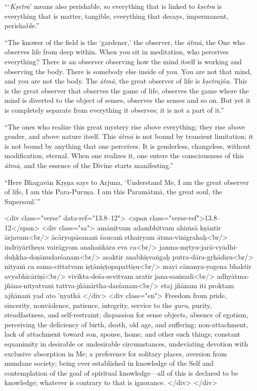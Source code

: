 \enquote{\enquote{\textit{Kṣetra}} means also perishable, so everything that is linked to \textit{kṣetra} is everything that is matter, tangible, everything that decays, impermanent, perishable.}

\enquote{The knower of the field is the \enquote{gardener,} the observer, the \textit{ātmā}, the One who observes life from deep within. When you sit in meditation, who perceives everything? There is an observer observing how the mind itself is working and observing the body. There is somebody else inside of you. You are not that mind, and you are not the body. The \textit{ātmā}, the great observer of life is \textit{kṣetrajña}. This is the great observer that observes the game of life, observes the game where the mind is diverted to the object of senses, observes the senses and so on. But yet it is completely separate from everything it observes; it is not a part of it.}

\enquote{The ones who realize this great mystery rise above everything; they rise above gender, and above nature itself. This \textit{ātmā} is not bound by transient limitation; it is not bound by anything that one perceives. It is genderless, changeless, without modification, eternal. When one realizes it, one enters the consciousness of this \textit{ātmā}, and the essence of the Divine starts manifesting.}

\enquote{Here Bhagavān Kṛṣṇa says to Arjuna, \enquote{Understand Me, I am the great observer of life, I am this Para-Puruṣa. I am this Paramātmā, the great soul, the Supersoul.}}


\begin{html}
<div class="verse" data-ref="13.8–12">
  <span class="verse-ref">13.8–12</span>
  <div class="sa">
    amānitvam adambhitvam ahiṁsā kṣāntir ārjavam<br/>
    ācāryopāsanaṁ śaucaṁ sthairyam ātma-vinigrahaḥ<br/>
    indriyārtheṣu vairāgyam anahaṅkāra eva ca<br/>
    janma-mṛtyu-jarā-vyādhi-duḥkha-doṣānudarśanam<br/>
    asaktir anabhiṣvaṅgaḥ putra-dāra-gṛhādiṣu<br/>
    nityaṁ ca sama-cittatvam iṣṭāniṣṭopapattiṣu<br/>
    mayi cānanya-yogena bhaktir avyabhicāriṇī<br/>
    vivikta-deśa-sevitvam aratir jana-saṁsadi<br/>
    adhyātma-jñāna-nityatvaṁ tattva-jñānārtha-darśanam<br/>
    etaj jñānam iti proktam ajñānaṁ yad ato ’nyathā
  </div>
  <div class="en">
    Freedom from pride, sincerity, nonviolence, patience, integrity, service to the \textit{guru}, purity, steadfastness, and self-restraint; dispassion for sense objects, absence of egotism, perceiving the deficiency of birth, death, old age, and suffering; non-attachment, lack of attachment toward son, spouse, home, and other such things; constant equanimity in desirable or undesirable circumstances, undeviating devotion with exclusive absorption in Me; a preference for solitary places, aversion from mundane society; being ever established in knowledge of the Self and contemplation of the goal of spiritual knowledge---all of this is declared to be knowledge; whatever is contrary to that is ignorance.
  </div>
</div>
\end{html}


